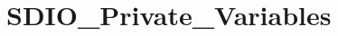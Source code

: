 \hypertarget{group___s_d_i_o___private___variables}{}\section{S\+D\+I\+O\+\_\+\+Private\+\_\+\+Variables}
\label{group___s_d_i_o___private___variables}
